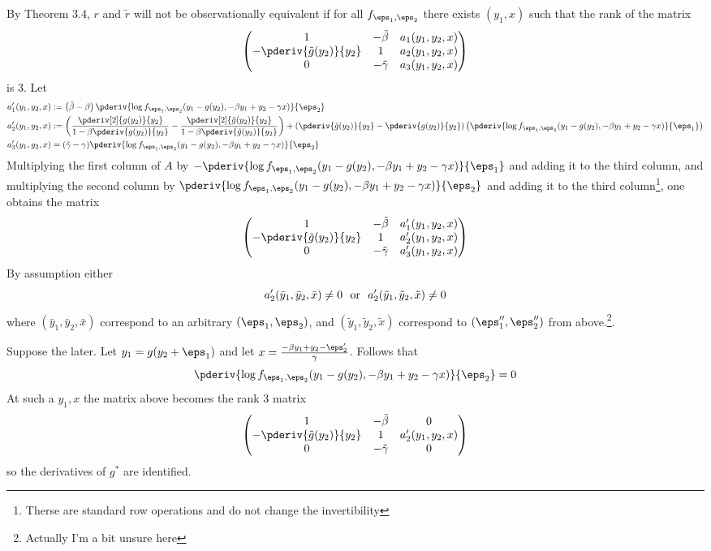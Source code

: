 By Theorem 3.4, $r$ and $\tilde{r}$ will not be observationally equivalent if for all $f_{\eps_1,\eps_2}$ there exists $(y_1, x)$ such that the rank of the matrix 
\[
\begin{pmatrix}
  1 & - \tilde{\beta} & a_1(y_1, y_2, x) \\
  -\pderiv{\tilde{g}(y_2)}{y_2} & 1 & a_2(y_1,y_2,x) \\
  0 & -\tilde{\gamma} & a_3(y_1,y_2,x)
\end{pmatrix}
\]
is 3. Let 
\begin{align*}
    a_1'(y_1,y_2,x) &:= \left(\tilde{\beta} - \beta\right)\pderiv{\log f_{\eps_1,\eps_2}(y_1 - g(y_2), -\beta y_1 + y_2 -\gamma x)}{\eps_2} \\ 
    a_2'(y_1, y_2,x) &:= \left(\frac{\pderiv[2]{g(y_2)}{y_2}}{1 - \beta\pderiv{g(y_2)}{y_2}} -  \frac{\pderiv[2]{\tilde{g}(y_2)}{y_2}}{1 - \beta\pderiv{\tilde{g}(y_2)}{y_2}}\right) + \left(\pderiv{\tilde{g}(y_2)}{y_2} - \pderiv{g(y_2)}{y_2}\right)\left(\pderiv{\log f_{\eps_1,\eps_2}(y_1 - g(y_2), -\beta y_1 + y_2  - \gamma x)}{\eps_1}\right) \\
    a_3'(y_1, y_2, x) &= (\tilde{\gamma} - \gamma)\pderiv{\log f_{\eps_1,\eps_2}(y_1 - g(y_2), -\beta y_1 + y_2 - \gamma x)}{\eps_2}
\end{align*}
Multiplying the first column of $A$ by $-\pderiv{\log f_{\eps_1,\eps_2}(y_1 - g(y_2), -\beta y_1 + y_2 -\gamma x)}{\eps_1}$ and adding it to the third column, and multiplying the second column by $\pderiv{\log f_{\eps_1,\eps_2}(y_1 - g(y_2), -\beta y_1 + y_2 -\gamma x)}{\eps_2}$ and adding it to the third column\footnote{Therse are standard row operations and do not change the invertibility}, one obtains the matrix 
\[
\begin{pmatrix}
  1 & -\tilde{\beta} & a_1'(y_1,y_2,x) \\
  -\pderiv{\tilde{g}(y_2)}{y_2} & 1 & a_2'(y_1, y_2, x) \\ 
  0 & -\tilde{\gamma} & a_3'(y_1, y_2, x)\\
\end{pmatrix}
\]
By assumption either 
\[a_2'(\bar{y}_1, \bar{y}_2, \bar{x})\neq 0\hbox{ }\text{ or }\hbox{ }a_2'(\tilde{y}_1,\tilde{y}_2,\tilde{x}) \neq 0\] where $(\bar{y}_1, \bar{y}_2, \bar{x})$ correspond to an arbitrary $(\eps_1,\eps_2)$, and $(\tilde{y}_1,\tilde{y}_2,\tilde{x})$ correspond to $(\eps_1'', \eps_2'')$ from above.\footnote{Actually I'm a bit unsure here}. 

Suppose the later. Let $y_1 = g(y_2 + \eps_1)$ and let $x = \frac{-\beta y_1 + y_2 - \eps_2'}{\gamma}$. Follows that 
\[\pderiv{\log f_{\eps_1,\eps_2} (y_1 - g(y_2), -\beta y_1 + y_2  - \gamma x)}{\eps_2} = 0\]
At such a $y_1,x$ the matrix above becomes the rank 3 matrix 
\[\begin{pmatrix}
  1 & -\tilde{\beta} & 0 \\ 
  -\pderiv{\tilde{g}(y_2)}{y_2} & 1 & a_2'(y_1,y_2,x) \\
  0 & -\tilde{\gamma} & 0
\end{pmatrix}\]
so the derivatives of $g^*$ are identified.